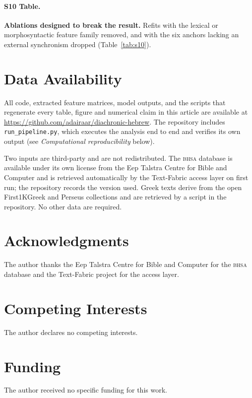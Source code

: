 \documentclass[10pt,letterpaper]{article}
\newcommand{\bhsa}{\textsc{bhsa}}
\begin{document}
\paragraph*{S10 Table.}
\label{S10_Table}
{\bf Ablations designed to break the result.}  Refits with the lexical or
morphosyntactic feature family removed, and with the six anchors lacking an
external synchronism dropped (Table~\ref{tab:s10}).

\section*{Data Availability}

All code, extracted feature matrices, model outputs, and the scripts that
regenerate every table, figure and numerical claim in this article are
available at \url{https://github.com/adairaar/diachronic-hebrew}.  The
repository includes \texttt{run\_pipeline.py}, which executes the analysis end
to end and verifies its own output (see \emph{Computational reproducibility}
below).

Two inputs are third-party and are not redistributed.  The \bhsa{} database is
available under its own license from the Eep Talstra Centre for Bible and
Computer and is retrieved automatically by the Text-Fabric access layer on
first run; the repository records the version used.  Greek texts derive from
the open First1KGreek and Perseus collections and are retrieved by a script in
the repository.  No other data are required.

\section*{Acknowledgments}

The author thanks the Eep Talstra Centre for Bible and Computer for the
\bhsa{} database and the Text-Fabric project for the access layer.

\section*{Competing Interests}

The author declares no competing interests.

\section*{Funding}

The author received no specific funding for this work.


\end{document}
